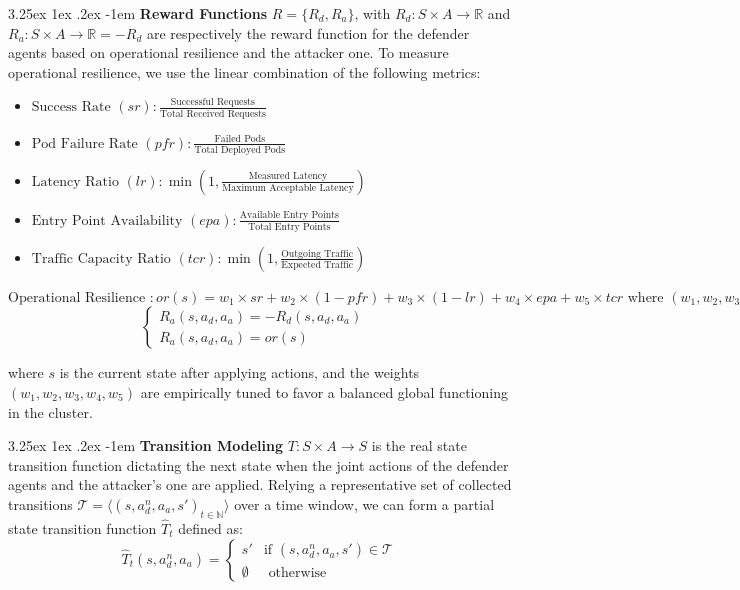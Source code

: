 \documentclass[conference]{IEEEtran}
\makeatletter
\renewcommand\paragraph{\@startsection{paragraph}{5}{\z@}%
  {3.25ex \@plus1ex \@minus.2ex}%
  {-1em}%
  {\normalfont\normalsize\bfseries}}
\makeatother
\begin{document}
\noindent \paragraph{\textbf{Reward Functions}} $R = \{R_d, R_a\}$, with $R_d: S \times A \to \mathbb{R}$ and $R_a: S \times A \to \mathbb{R} = - R_d$ are respectively the reward function for the defender agents based on operational resilience and the attacker one.
To measure operational resilience, we use the linear combination of the following metrics:
%
\begin{itemize}
    \item $\text{Success Rate } (sr) : \frac{\text{Successful Requests}}{\text{Total Received Requests}}$

    \item $\text{Pod Failure Rate } (pfr) : \frac{\text{Failed Pods}}{\text{Total Deployed Pods}}$
    
    \item $\text{Latency Ratio } (lr) : \min\left(1,\frac{\text{Measured Latency}}{\text{Maximum Acceptable Latency}}\right)$
    
    \item $\text{Entry Point Availability } (epa) : \frac{\text{Available Entry Points}}{\text{Total Entry Points}}$
    
    \item $\text{Traffic Capacity Ratio } (tcr) : \min\left(1, \frac{\text{Outgoing Traffic}}{\text{Expected Traffic}}\right)$
\end{itemize}
%
$\text{Operational Resilience }: or(s) = w_1 \times sr
\allowbreak + w_2 \times (1 - pfr)
\allowbreak + w_3 \times (1 - lr)
\allowbreak + w_4 \times epa
\allowbreak + w_5 \times tcr
\text{ where } (w_1, w_2, w_3, w_4, w_5) \text{ are relative weights.}$
$$
\begin{cases} 
    R_a(s, a_d, a_a) = -R_d(s, a_d, a_a) & \\
    R_a(s, a_d, a_a) = or(s)
\end{cases}
$$

where $s$ is the current state after applying actions, and the weights $(w_1, w_2, w_3, w_4, w_5)$ are empirically tuned to favor a balanced global functioning in the cluster.


\noindent \paragraph{\textbf{Transition Modeling}} $T: S \times A \rightarrow S$ is the real state transition function dictating the next state when the joint actions of the defender agents and the attacker's one are applied. Relying a representative set of collected transitions $\mathcal{T} = \langle(s, a_d^n, a_a, s')_{t\in \mathbb{N}}\rangle$ over a time window, we can form a partial state transition function $\hat{T}_t$ defined as:
%
$$
\hat{T}_t(s, a_d^n, a_a) =
\begin{cases} 
    s' & \text{if } (s, a_d^n, a_a, s') \in \mathcal{T} \\
    \emptyset & \text{ otherwise}
\end{cases}
$$
\end{document}

